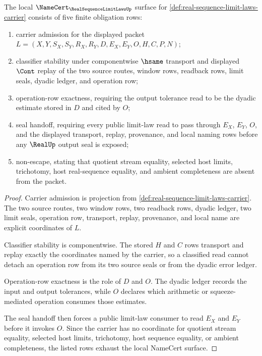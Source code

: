 \begin{theorem}
\label{thm:real-sequence-limit-laws-namecert-obligations}
The local $\NameCert_{\RealSequenceLimitLawsUp}$ surface for
\autoref{def:real-sequence-limit-laws-carrier} consists of five finite
obligation rows:
\begin{enumerate}
\item carrier admission for the displayed packet
$L=(X,Y,S_X,S_Y,R_X,R_Y,D,E_X,E_Y,O,H,C,P,N)$;
\item classifier stability under componentwise $\hsame$ transport and
displayed $\Cont$ replay of the two source routes, window rows, readback rows,
limit seals, dyadic ledger, and operation row;
\item operation-row exactness, requiring the output tolerance read to be the
dyadic estimate stored in $D$ and cited by $O$;
\item seal handoff, requiring every public limit-law read to pass through
$E_X$, $E_Y$, $O$, and the displayed transport, replay, provenance, and local
naming rows before any $\RealUp$ output seal is exposed;
\item non-escape, stating that quotient stream equality, selected host limits,
trichotomy, host real-sequence equality, and ambient completeness are absent
from the packet.
\end{enumerate}
\end{theorem}
\begin{proof}
Carrier admission is projection from
\autoref{def:real-sequence-limit-laws-carrier}. The two source routes, two
window rows, two readback rows, dyadic ledger, two limit seals, operation row,
transport, replay, provenance, and local name are explicit coordinates of
$L$.

Classifier stability is componentwise. The stored $H$ and $C$ rows transport
and replay exactly the coordinates named by the carrier, so a classified read
cannot detach an operation row from its two source seals or from the dyadic
error ledger.

Operation-row exactness is the role of $D$ and $O$. The dyadic ledger records
the input and output tolerances, while $O$ declares which arithmetic or
squeeze-mediated operation consumes those estimates.

The seal handoff then forces a public limit-law consumer to read $E_X$ and
$E_Y$ before it invokes $O$. Since the carrier has no coordinate for quotient
stream equality, selected host limits, trichotomy, host sequence equality, or
ambient completeness, the listed rows exhaust the local NameCert surface.
\end{proof}

